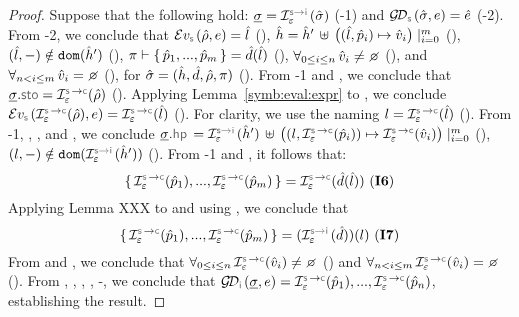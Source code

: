 \begin{proof}
Suppose that the following hold: 
$\istate = \interpret{\symbinst}{\senv}(\sstate)$ (\hyp{1}) and $\absgetdomainfun{\symbolic}(\sstate, \jsilexpr) = \sexpr$ (\hyp{2}). 
From \hyp{2}, we conclude that 
$\evalexpr{\symbolic}(\sstore, \jsilexpr) = \sloc$ (), 
$\hat{h} = \hat{h}' \, \uplus \, \big((\hat{l}, \hat{p}_i) \mapsto \hat{v}_i \big)\mid_{i = 0}^m$ (), 
$(\hat{l},-) \notin \texttt{dom} (\hat{h}')$ (), 
$\pi \vdash \{ \, \hat{p}_1, ..., \hat{p}_m \, \} = \hat{d}(\hat{l})$ (), 
$\forall_{0 \leq i \leq n} \, \sexprv_i \neq \none$ (), 
and $\forall_{n < i \leq m} \, \sexprv_i = \none$ (), for $\hat{\sigma} = (\hat{h}, \hat{d}, \hat\rho, \pi)$ (). 
From \hyp{1} and , we conclude that $\istate.\stosel = \interpret{\symbconc}{\senv}(\sstore)$ (). 
 Applying Lemma~\ref{symb:eval:expr} to , we conclude 
 $\evalexpr{\symbolic}(\interpret{\symbconc}{\senv}(\sstore), \jsilexpr) = \interpret{\symbconc}{\senv}(\sloc)$ (). 
 For clarity, we use the naming $\loc = \interpret{\symbconc}{\senv}(\sloc)$ (). 
 From \hyp{1}, , , and , we conclude 
 $\istate.\hpsel =  \interpret{\symbinst}{\senv}(\sheap') \, \uplus \, \big((\loc, \interpret{\symbconc}{\senv}(\sexprp_i)) \mapsto \interpret{\symbconc}{\senv}(\sexprv_i) \big)\mid_{i = 0}^m$ (), 
$(\loc,-) \notin \domain (\interpret{\symbinst}{\senv}(\sheap'))$ ().
From \hyp{1} and , it follows that: 
$$\jsilset{\interpret{\symbconc}{\senv}(\sexprp_1), ..., \interpret{\symbconc}{\senv}(\sexprp_m)} = \interpret{\symbconc}{\senv}(\sdom(\sloc)) \text{ (\ieq{6})}$$
Applying Lemma XXX to  and using , we conclude that 
 $$\jsilset{\interpret{\symbconc}{\senv}(\sexprp_1), ..., \interpret{\symbconc}{\senv}(\sexprp_m)} = (\interpret{\symbinst}{\senv}(\sdom))(\loc) \text{ (\ieq{7})}$$ 
 From  and , we conclude that 
 {\small $\forall_{0 \leq i \leq n} \, \interpret{\symbconc}{\senv}(\sexprv_i) \neq \none$} () and  
{\small $\forall_{n < i \leq m} \, \interpret{\symbconc}{\senv}(\sexprv_i) = \none$} ().
From , , , , -, we conclude that 
$\absgetdomainfun{\instrumented}(\istate, \jsilexpr) = \interpret{\symbconc}{\senv}(\sexprp_1), ..., \interpret{\symbconc}{\senv}(\sexprp_n)$, 
establishing the result. 
\end{proof}

